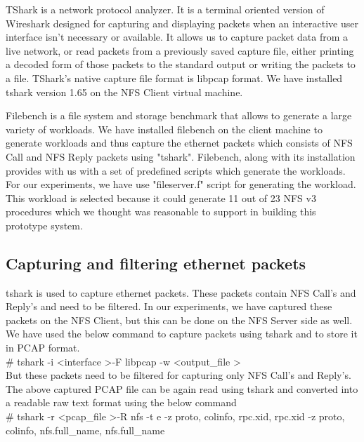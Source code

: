 \documentclass[conference]{IEEEtran}
\begin{document}
TShark is a network protocol analyzer. It is a terminal oriented version of Wireshark designed for capturing and displaying packets when an interactive user interface isn't necessary or available. It allows us to capture packet data from a live network, or read packets from a previously saved capture file, either printing a decoded form of those packets to the standard output or writing the packets to a file. TShark's native capture file format is libpcap format. We have installed tshark version 1.65 on the NFS Client virtual machine.

Filebench is a file system and storage benchmark that allows to generate a large variety of workloads. We have installed filebench on the client machine to generate workloads and thus capture the ethernet packets which consists of NFS Call and NFS Reply packets using "tshark". Filebench, along with its installation provides with us with a set of predefined scripts which generate the workloads. For our experiments, we have use "fileserver.f" script for generating the workload. This workload is selected because it could generate 11 out of 23 NFS v3 procedures which we thought was reasonable to support in building this prototype system.

\subsection{Capturing and filtering ethernet packets}
tshark is used to capture ethernet packets. These packets contain NFS Call's and Reply's and need to be filtered. In our experiments, we have captured these packets on the NFS Client, but this can be done on the NFS Server side as well. We have used the below command to capture packets using tshark and to store it in PCAP format.\\

\noindent
\# tshark -i \textless interface \textgreater -F libpcap -w \textless output\_file \textgreater\\

\noindent
But these packets need to be filtered for capturing only NFS Call's and Reply's. The above captured PCAP file can be again read using tshark and converted into a readable raw text format using the below command\\

\noindent
\# tshark -r \textless pcap\_file \textgreater -R nfs -t e -z proto, colinfo, rpc.xid, rpc.xid -z proto, colinfo, nfs.full\_name, nfs.full\_name\\
\end{document}
